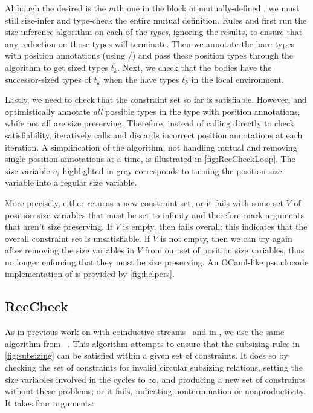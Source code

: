 Although the desired \cofixpoint is the $m$th one in the block of mutually-defined \cofixpoints, we must still size-infer and type-check the entire mutual definition.
Rules  and  first run the size inference algorithm on each of the \cofixpoint \emph{types}, ignoring the results, to ensure that any reduction on those types will terminate.
Then we annotate the bare types with position annotations (using \setrecstars/\setcorecstars) and pass these position types through the algorithm to get sized types $\overline{t_k}$.
Next, we check that the \cofixpoint bodies have the successor-sized types of $\overline{t_k}$ when the \cofixpoints have types $\overline{t_k}$ in the local environment.




Lastly, we need to check that the constraint set so far is satisfiable.
However, \setrecstars and \setcorecstars optimistically annotate \textit{all} possible \coinductive types in the \cofixpoint type with position annotations, while not all \cofixpoints are size preserving.
Therefore, instead of calling \RecCheck directly to check satisfiability,
\RecCheckLoop iteratively calls \RecCheck and discards incorrect position annotations at each iteration.
A simplification of the algorithm, not handling mutual \cofixpoints and removing single position annotations at a time,
is illustrated in \autoref{fig:RecCheckLoop}.
The size variable $\upsilon_i$ highlighted in grey corresponds to turning the position size variable into a regular size variable.

More precisely, \RecCheck either returns a new constraint set,
or it fails with some set $V$ of position size variables that must be set to infinity
and therefore mark arguments that aren't size preserving.
If $V$ is empty, then \RecCheckLoop fails overall: this indicates that the overall constraint set is unsatisfiable.
If $V$ is not empty, then we can try \RecCheck again after removing the size variables in $V$ from our set of position size variables,
thus no longer enforcing that they must be size preserving.
An OCaml-like pseudocode implementation of \RecCheckLoop is provided by \autoref{fig:helpers}.

\subsection{RecCheck}\label{sec:algorithm:reccheck}

As in previous work on \CChatomega with coinductive streams~\citep{cc-hat-omega} and in \CIChat, we use the same \RecCheck algorithm from \Fhat~\citep{f-hat}.
This algorithm attempts to ensure that the subsizing rules in \autoref{fig:subsizing} can be satisfied within a given set of constraints.
It does so by checking the set of constraints for invalid circular subsizing relations, setting the size variables involved in the cycles to $\infty$, and producing a new set of constraints without these problems; or it fails, indicating nontermination or nonproductivity.
It takes four arguments:

